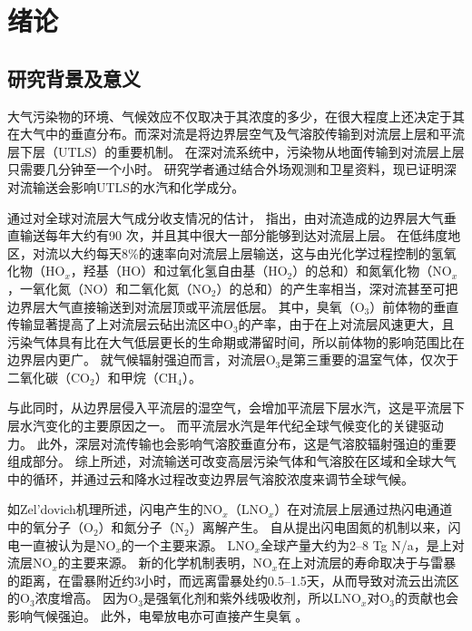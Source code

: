 
\chapter{绪论}

\section{研究背景及意义}

大气污染物的环境、气候效应不仅取决于其浓度的多少，在很大程度上还决定于其在大气中的垂直分布。而深对流是将边界层空气及气溶胶传输到对流层上层和平流层下层（UTLS）的重要机制\citep{Chatfield.1984,Dickerson.1987,Pickering.1989,Yin.2002}。
在深对流系统中，污染物从地面传输到对流层上层只需要几分钟至一个小时\citep{Skamarock.2000}。
研究学者通过结合外场观测\citep{Dickerson.1987,Pickering.1996,Bertram.2007,Apel.2012,Pan.2017}和卫星资料\citep{Halland.2009,Barth.2012,Livesey.2013,Jensen.2015}，现已证明深对流输送会影响UTLS的水汽和化学成分。

通过对全球对流层大气成分收支情况的估计， \citet{Cotton.1995}指出，由对流造成的边界层大气垂直输送每年大约有90 次，并且其中很大一部分能够到达对流层上层。
在低纬度地区，对流以大约每天8\%的速率向对流层上层输送，这与由光化学过程控制的氢氧化物（HO$_x$，羟基（HO）和过氧化氢自由基（HO$_2$）的总和）和氮氧化物（NO$_x$，一氧化氮（NO）和二氧化氮（NO$_2$）的总和）的产生率相当，深对流甚至可把边界层大气直接输送到对流层顶或平流层低层\citep{Prather.1997}。
其中，臭氧（O$_3$）前体物的垂直传输显著提高了上对流层云砧出流区中O$_3$的产率\citep{Pickering.1990,Pickering.1992,Pickering.1992a}，由于在上对流层风速更大，且污染气体具有比在大气低层更长的生命期或滞留时间，所以前体物的影响范围比在边界层内更广。
就气候辐射强迫而言，对流层O$_3$是第三重要的温室气体，仅次于二氧化碳（CO$_2$）和甲烷（CH$_4$）\citep{Myhre.2013}。

与此同时，从边界层侵入平流层的湿空气，会增加平流层下层水汽\citep{Homeyer.2014}，这是平流层下层水汽变化的主要原因之一。
而平流层水汽是年代纪全球气候变化的关键驱动力\citep{Solomon.2010}。 此外，深层对流传输也会影响气溶胶垂直分布，这是气溶胶辐射强迫的重要组成部分\citep{Mishra.2012,Park.2015}。
综上所述，对流输送可改变高层污染气体和气溶胶在区域和全球大气中的循环\citep{Clarisse.2011}，并通过云和降水过程改变边界层气溶胶浓度来调节全球气候\citep{Taylor.1997}。

如Zel'dovich机理所述\citep{Zeldovich.1967}，闪电产生的NO$_x$（LNO$_x$）在对流层上层通过热闪电通道中的氧分子（O$_2$）和氮分子（N$_2$）离解产生。
自从\citet{Liebig.1827}提出闪电固氮的机制以来，闪电一直被认为是NO$_x$的一个主要来源\citep{Hutchinson.1954}。
LNO$_x$全球产量大约为2–8 Tg N/a，是上对流层NO$_x$的主要来源\citep{Galloway.2004,Schumann.2007}。
新的化学机制表明，NO$_x$在上对流层的寿命取决于与雷暴的距离，在雷暴附近约3小时，而远离雷暴处约0.5–1.5天\citep{Nault.2016,Nault.2017}，从而导致对流云出流区的O$_3$浓度增高\citep{Pickering.1996,Hauglustaine.2001,DeCaria.2005}。
因为O$_3$是强氧化剂和紫外线吸收剂\citep{Myhre.2013}，所以LNO$_x$对O$_3$的贡献也会影响气候强迫。
此外，电晕放电亦可直接产生臭氧 \citep{Minschwaner.2008,Kotsakis.2017}。

